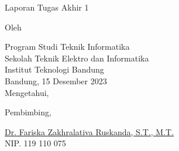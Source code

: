 \clearpage
\pagestyle{empty}

\begin{center}
    \smallskip
    
    \Large \bfseries \MakeUppercase{\thetitle}
    \vfill
    
    \Large Laporan Tugas Akhir 1
    \vfill
    
    \large Oleh
    
    \Large \theauthor
    
    \large Program Studi Teknik Informatika \\
    
    \normalsize \normalfont
    Sekolah Teknik Elektro dan Informatika \\
    Institut Teknologi Bandung \\
    
    \vfill
    \normalsize \normalfont
    Bandung, 15 Desember 2023 \\
    Mengetahui,
    
    \vspace{0.5cm}
    Pembimbing,
    
    \vfill
    \underline{Dr. Fariska Zakhralativa Ruskanda, S.T., M.T.} \\
    NIP. 119 110 075
    
\end{center}
\clearpage
